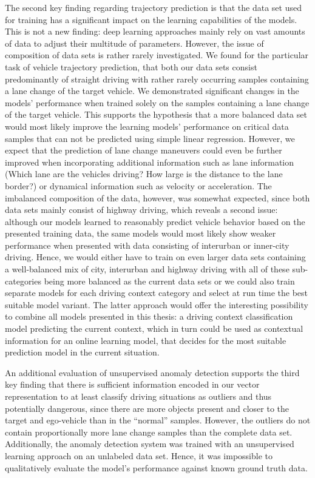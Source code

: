 The second key finding regarding trajectory prediction is that the data set used for training has a significant impact on the learning capabilities of the models.
This is not a new finding: deep learning approaches mainly rely on vast amounts of data to adjust their multitude of parameters.
However, the issue of composition of data sets is rather rarely investigated.
We found for the particular task of vehicle trajectory prediction, that both our data sets consist predominantly of straight driving with rather rarely occurring samples containing a lane change of the target vehicle.
We demonstrated significant changes in the models' performance when trained solely on the samples containing a lane change of the target vehicle.
This supports the hypothesis that a more balanced data set would most likely improve the learning models' performance on critical data samples that can not be predicted using simple linear regression.
However, we expect that the prediction of lane change maneuvers could even be further improved when incorporating additional information such as lane information (Which lane are the vehicles driving? How large is the distance to the lane border?) or dynamical information such as velocity or acceleration.
The imbalanced composition of the data, however, was somewhat expected, since both data sets mainly consist of highway driving, which reveals a second issue: although our models learned to reasonably predict vehicle behavior based on the presented training data, the same models would most likely show weaker performance when presented with data consisting of interurban or inner-city driving.
Hence, we would either have to train on even larger data sets containing a well-balanced mix of city, interurban and highway driving with all of these sub-categories being more balanced as the current data sets or we could also train separate models for each driving context category and select at run time the best suitable model variant.
The latter approach would offer the interesting possibility to combine all models presented in this thesis: a driving context classification model predicting the current context, which in turn could be used as contextual information for an online learning model, that decides for the most suitable prediction model in the current situation.

An additional evaluation of unsupervised anomaly detection supports the third key finding that there is sufficient information encoded in our vector representation to at least classify driving situations as outliers and thus potentially dangerous, since there are more objects present and closer to the target and ego-vehicle than in the \enquote{normal} samples.
However, the outliers do not contain proportionally more lane change samples than the complete data set.
Additionally, the anomaly detection system was trained with an unsupervised learning approach on an unlabeled data set.
Hence, it was impossible to qualitatively evaluate the model's performance against known ground truth data.

